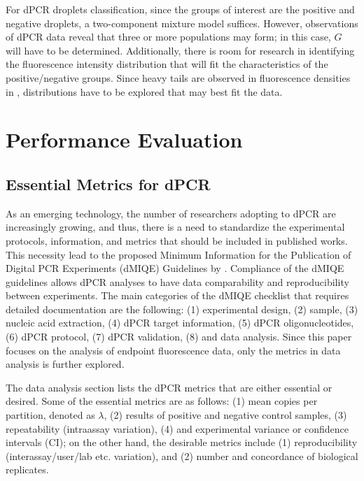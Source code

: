 For dPCR droplets classification, since the groups of interest are the positive and negative droplets, a two-component mixture model suffices. However, observations of dPCR data reveal that three or more populations may form; in this case, \(G\) will have to be determined. Additionally, there is room for research in identifying the fluorescence intensity distribution that will fit the characteristics of the positive/negative groups. Since heavy tails are observed in fluorescence densities in , distributions have to be explored that may best fit the data. 


\section{Performance Evaluation}
\label{sec:ch2_perfeval_estimates}

\subsection{Essential Metrics for dPCR}
\label{sec:ch2_perfeval_essentialMetrics}
As an emerging technology, the number of researchers adopting to dPCR are increasingly growing, and thus, there is a need to standardize the experimental protocols, information, and metrics that should be included in published works. This necessity lead to the proposed Minimum Information for the Publication of Digital PCR Experiments (dMIQE) Guidelines by . Compliance of the dMIQE guidelines allows dPCR analyses to have data comparability and reproducibility between experiments. The main categories of the dMIQE checklist that requires detailed documentation are the following: (1) experimental design, (2) sample, (3) nucleic acid extraction, (4) dPCR target information, (5) dPCR oligonucleotides, (6) dPCR protocol, (7) dPCR validation, (8) and data analysis. Since this paper focuses on the analysis of endpoint fluorescence data, only the metrics in data analysis is further explored.

The data analysis section lists the dPCR metrics that are either essential or desired. Some of the essential metrics are as follows: (1) mean copies per partition, denoted as \(\lambda\), (2) results of positive and negative control samples, (3) repeatability (intraassay variation), (4) and experimental variance or confidence intervals (CI); on the other hand, the desirable metrics include (1) reproducibility (interassay/user/lab etc. variation), and (2) number and concordance of biological replicates. 

